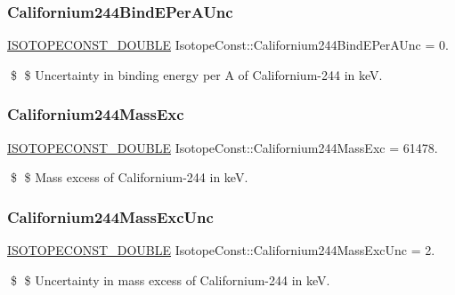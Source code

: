 \subsubsection{\texorpdfstring{Californium244\+Bind\+E\+Per\+A\+Unc}{Californium244BindEPerAUnc}}
{\footnotesize\ttfamily \mbox{\hyperlink{group___isotope_const-_macros_ga8f45a7272ce02c0b4c65c44636ed719a}{I\+S\+O\+T\+O\+P\+E\+C\+O\+N\+S\+T\+\_\+\+D\+O\+U\+B\+LE}} Isotope\+Const\+::\+Californium244\+Bind\+E\+Per\+A\+Unc = 0.}

\$ \$ Uncertainty in binding energy per A of Californium-\/244 in keV. \mbox{\label{group___isotope_const-_californium-_cf244_ga6c19a0148dcbeba51f1e45253f70b037}} 
\subsubsection{\texorpdfstring{Californium244\+Mass\+Exc}{Californium244MassExc}}
{\footnotesize\ttfamily \mbox{\hyperlink{group___isotope_const-_macros_ga8f45a7272ce02c0b4c65c44636ed719a}{I\+S\+O\+T\+O\+P\+E\+C\+O\+N\+S\+T\+\_\+\+D\+O\+U\+B\+LE}} Isotope\+Const\+::\+Californium244\+Mass\+Exc = 61478.}

\$ \$ Mass excess of Californium-\/244 in keV. \mbox{\label{group___isotope_const-_californium-_cf244_gafc7accbb69523ac5da7258437b3fcd69}} 
\subsubsection{\texorpdfstring{Californium244\+Mass\+Exc\+Unc}{Californium244MassExcUnc}}
{\footnotesize\ttfamily \mbox{\hyperlink{group___isotope_const-_macros_ga8f45a7272ce02c0b4c65c44636ed719a}{I\+S\+O\+T\+O\+P\+E\+C\+O\+N\+S\+T\+\_\+\+D\+O\+U\+B\+LE}} Isotope\+Const\+::\+Californium244\+Mass\+Exc\+Unc = 2.}

\$ \$ Uncertainty in mass excess of Californium-\/244 in keV. \mbox{\label{group___isotope_const-_californium-_cf244_ga7f323215428734cb8234059316809bfd}} 
